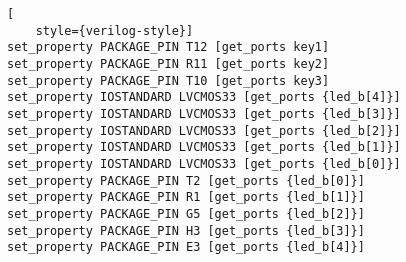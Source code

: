 \begin{lstlisting}[
    style={verilog-style}]
set_property PACKAGE_PIN T12 [get_ports key1]
set_property PACKAGE_PIN R11 [get_ports key2]
set_property PACKAGE_PIN T10 [get_ports key3]
set_property IOSTANDARD LVCMOS33 [get_ports {led_b[4]}]
set_property IOSTANDARD LVCMOS33 [get_ports {led_b[3]}]
set_property IOSTANDARD LVCMOS33 [get_ports {led_b[2]}]
set_property IOSTANDARD LVCMOS33 [get_ports {led_b[1]}]
set_property IOSTANDARD LVCMOS33 [get_ports {led_b[0]}]
set_property PACKAGE_PIN T2 [get_ports {led_b[0]}]
set_property PACKAGE_PIN R1 [get_ports {led_b[1]}]
set_property PACKAGE_PIN G5 [get_ports {led_b[2]}]
set_property PACKAGE_PIN H3 [get_ports {led_b[3]}]
set_property PACKAGE_PIN E3 [get_ports {led_b[4]}]

\end{lstlisting}   
    
